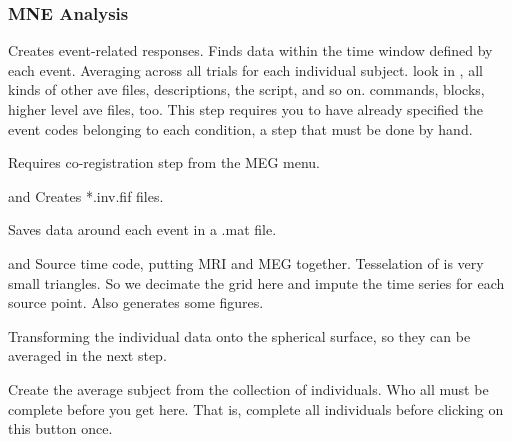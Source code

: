 \documentclass[11pt]{article}
\begin{document}
\subsubsection{MNE Analysis}

\begin{itemize}

Creates event-related responses.  Finds data
  within the time window defined by each event.  Averaging across all
  trials for each individual subject.  look in ,
  all kinds of other ave  files, descriptions, the script, and so
  on. commands, blocks, higher
  level ave files, too.  This step requires you to have already specified the
  event codes belonging to each condition, a step that must be done by hand.

%
{}  Requires
co-registration step from the MEG menu.

%
{
  and } Creates *.inv.fif files.

%
{} Saves data
around each event in a .mat file.

%
{ and }
Source time code, putting MRI and MEG together.
  Tesselation of \fs is very small triangles.  So we decimate
  the grid here and impute the time series for each source point.
  Also generates some figures.

  Transforming the individual data onto the
  spherical surface, so they can be averaged in the next step.

%
{} Create the average
subject from the collection of individuals.  Who all must be complete
before you get here.  That is, complete all individuals before
clicking on this button once.

\end{itemize}
\end{document}
